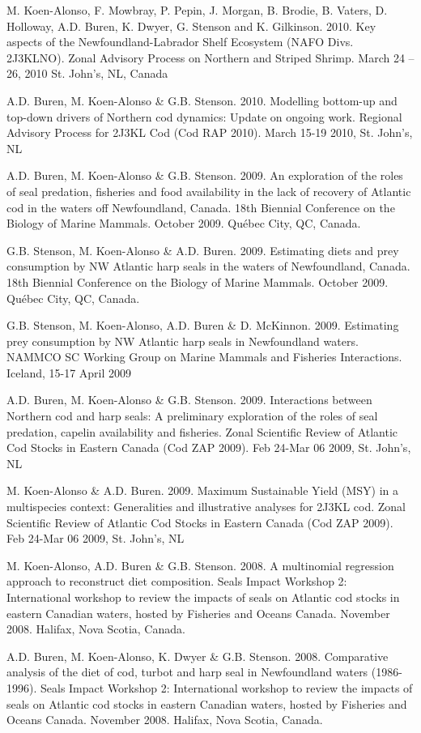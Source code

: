 \documentclass{res}
\begin{document}
\begin{resume}
\begin{hangparas}{.4in}{1}
\pagebreak
M. Koen-Alonso, F. Mowbray, P. Pepin, J. Morgan, B. Brodie, B. Vaters, D. Holloway, A.D. Buren, K. Dwyer, G. Stenson and K. Gilkinson. 2010. Key aspects of the Newfoundland-Labrador Shelf Ecosystem (NAFO Divs. 2J3KLNO). Zonal Advisory Process on Northern and Striped Shrimp. March 24 – 26, 2010 St. John’s, NL, Canada

A.D. Buren, M. Koen-Alonso \& G.B. Stenson. 2010. Modelling bottom-up and top-down drivers of Northern cod dynamics: Update on ongoing work. Regional Advisory Process for 2J3KL Cod (Cod RAP 2010). March 15-19 2010, St. John’s, NL

A.D. Buren, M. Koen-Alonso \& G.B. Stenson. 2009. An exploration of the roles of seal predation, fisheries and food availability in the lack of recovery of Atlantic cod in the waters off Newfoundland, Canada. 18th Biennial Conference on the Biology of Marine Mammals. October 2009. Qu\'{e}bec City, QC, Canada.

G.B. Stenson, M. Koen-Alonso \& A.D. Buren. 2009. Estimating diets and prey consumption by NW Atlantic harp seals in the waters of Newfoundland, Canada. 18th Biennial Conference on the Biology of Marine Mammals. October 2009. Qu\'{e}bec City, QC, Canada.

G.B. Stenson, M. Koen-Alonso, A.D. Buren \& D. McKinnon. 2009. Estimating prey consumption by NW Atlantic harp seals in Newfoundland waters. NAMMCO SC Working Group on Marine Mammals and Fisheries Interactions. Iceland, 15-17 April 2009

A.D. Buren, M. Koen-Alonso \& G.B. Stenson. 2009. Interactions between Northern cod and harp seals: A preliminary exploration of the roles of seal predation, capelin availability and fisheries. Zonal Scientific Review of Atlantic Cod Stocks in Eastern Canada (Cod ZAP 2009). Feb 24-Mar 06 2009, St. John’s, NL

M. Koen-Alonso \& A.D. Buren. 2009. Maximum Sustainable Yield (MSY) in a multispecies context: Generalities and illustrative analyses for 2J3KL cod. Zonal Scientific Review of Atlantic Cod Stocks in Eastern Canada (Cod ZAP 2009). Feb 24-Mar 06 2009, St. John’s, NL

M. Koen-Alonso, A.D. Buren \& G.B. Stenson. 2008. A multinomial regression approach to reconstruct diet composition. Seals Impact Workshop 2: International workshop to review the impacts of seals on Atlantic cod stocks in eastern Canadian waters, hosted by Fisheries and Oceans Canada. November 2008. Halifax, Nova Scotia, Canada.

A.D. Buren, M. Koen-Alonso, K. Dwyer \& G.B. Stenson. 2008. Comparative analysis of the diet of cod, turbot and harp seal in Newfoundland waters (1986-1996). Seals Impact Workshop 2: International workshop to review the impacts of seals on Atlantic cod stocks in eastern Canadian waters, hosted by Fisheries and Oceans Canada. November 2008. Halifax, Nova Scotia, Canada.


\end{hangparas}
\end{resume}
\end{document}
